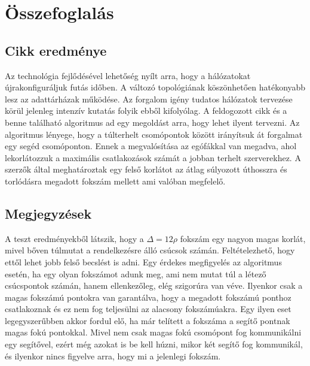 \documentclass[12pt]{report}
\begin{document}
\chapter{Összefoglalás}

\section{Cikk eredménye}

Az technológia fejlődésével lehetőség nyílt arra, hogy a hálózatokat újrakonfiguráljuk futás időben.
A változó topológiának köszönhetően hatékonyabb lesz az adattárházak működése.
Az forgalom igény tudatos hálózatok tervezése körül jelenleg intenzív kutatás folyik ebből kifolyólag. 
A feldogozott cikk és a benne található algoritmus ad egy megoldást arra, hogy lehet ilyent tervezni.
Az algoritmus lényege, hogy a túlterhelt csomópontok között irányítsuk át forgalmat egy segéd csomóponton.
Ennek a megvalósítása az egófákkal van megadva, ahol lekorlátozzuk a maximális csatlakozások számát a jobban terhelt szerverekhez.
A szerzők által meghatároztak egy felső korlátot az átlag súlyozott úthosszra és torlódásra megadott fokszám mellett ami valóban megfelelő.


\section{Megjegyzések}

A teszt eredményekből látszik, hogy a $\Delta=12\rho$ fokszám egy nagyon magas korlát, mivel bőven túlmutat a rendelkezésre álló csúcsok számán. Feltételezhető, hogy ettől lehet jobb felső becslést is adni. 
Egy érdekes megfigyelés az algoritmus esetén, ha egy olyan fokszámot adunk meg, ami nem mutat túl a létező csúcspontok számán, hanem ellenkezőleg, elég szigorúra van véve.
Ilyenkor csak a magas fokszámú pontokra van garantálva, hogy a megadott fokszámú ponthoz csatlakoznak és ez nem fog teljesülni az alacsony fokszámúakra.
Egy ilyen eset legegyszerűbben akkor fordul elő, ha már telített a fokszáma a segítő pontnak magas fokú pontokkal. 
Mivel nem csak magas fokú csomópont fog kommunikálni egy segítővel, ezért még azokat is be kell húzni, mikor két segítő fog kommunikál, és ilyenkor nincs figyelve arra, hogy mi a jelenlegi fokszám. 




	
\end{document}
